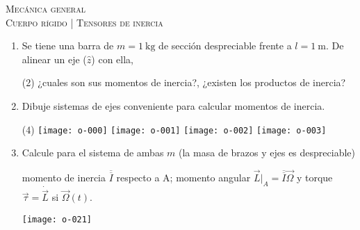 \documentclass[11pt,spanish,a4paper]{article}
\begin{document}
\begin{center}
  \textsc{\large Mecánica general}\\
  \textsc{\large Cuerpo rígido | Tensores de inercia}
\end{center}


\begin{enumerate}



\item Se tiene una barra de \(m= \SI{1}{\kilo\gram}\) de sección despreciable frente a \(l= \SI{1}{\metre}\).
De alinear un eje (\(\hat{z}\)) con ella, 
\begin{tasks}(2)
	\task	¿cuales son sus momentos de inercia?,
	\task ¿existen los productos de inercia? 
\end{tasks}


\item
Dibuje sistemas de ejes conveniente para calcular momentos de inercia.
\vspace{-1.1cm}
\begin{tasks}(4)
	\task \texttt{[image: o-000]}
	\task \texttt{[image: o-001]}
	\task \texttt{[image: o-002]}
	\task \texttt{[image: o-003]}
\end{tasks}


\item 
\begin{minipage}[t][2.8cm]{0.7\textwidth}
Calcule para el sistema de ambas $m$ (la masa de brazos y ejes es despreciable)
\begin{tasks} 
	\task momento de inercia \(\overline{\overline{I}}\) respecto a A;
	\task momento angular $\vec{L}\bigg\rvert_A = \overline{\overline{I}} \vec{\Omega}$ y torque $\vec{\tau} = \dot{\vec{L}}$ si $\vec{\Omega}(t)$.
\end{tasks}
\end{minipage}
\begin{minipage}[c][1cm][t]{0.25\textwidth}
	\texttt{[image: o-021]}
\end{minipage}




\end{enumerate}
\end{document}
